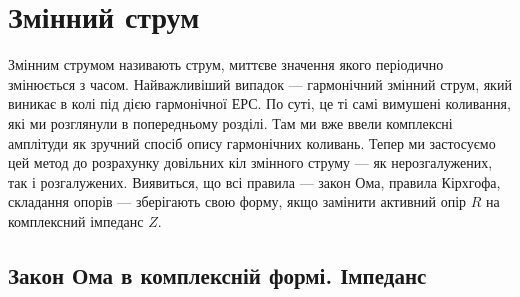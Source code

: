 \section{Змінний струм}\label{sec:ac}\hypertarget{ac-current}{}

Змінним струмом називають струм, миттєве значення якого періодично змінюється з часом. Найважливіший випадок --- гармонічний змінний струм, який виникає в колі під дією гармонічної ЕРС. По суті, це ті самі вимушені коливання, які ми розглянули в попередньому розділі. Там ми вже ввели комплексні амплітуди як зручний спосіб опису гармонічних коливань. Тепер ми застосуємо цей метод до розрахунку довільних кіл змінного струму --- як нерозгалужених, так і розгалужених. Виявиться, що всі правила --- закон Ома, правила Кірхгофа, складання опорів --- зберігають свою форму, якщо замінити активний опір $R$ на комплексний імпеданс $Z$.


\subsection*{Закон Ома в комплексній формі. Імпеданс}

